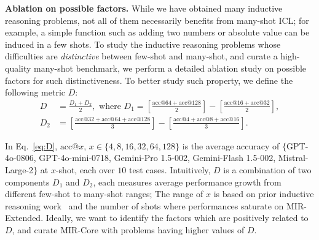 \textbf{Ablation on possible factors.} While we have obtained many inductive reasoning problems, not all of them necessarily benefits from many-shot ICL; for example, a simple function such as adding two numbers or absolute value can be induced in a few shots. To study the inductive reasoning problems whose difficulties are \textit{distinctive} between few-shot and many-shot, and curate a high-quality many-shot benchmark, we perform a detailed ablation study on possible factors for such distinctiveness. To better study such property, we define the following metric $D$:
\begin{equation}
\label{eq:D}
\begin{aligned}
D&=\frac{D_1+D_2}{2},\text{ where }
D_1=\left[\frac{\text{acc}@64+\text{acc}@128}{2}\right]-\left[\frac{\text{acc}@16+\text{acc}@32}{2}\right],\\
D_2&=\left[\frac{\text{acc}@32+\text{acc}@64+\text{acc}@128}{3}\right]-\left[\frac{\text{acc}@4+\text{acc}@8+\text{acc}@16}{3}\right].
\end{aligned}
\end{equation}
 

In Eq.~\eqref{eq:D}, $\text{acc}@x$, $x\in\{4,8,16,32,64,128\}$ is the average accuracy of $\{$GPT-4o-0806, GPT-4o-mini-0718, Gemini-Pro 1.5-002, Gemini-Flash 1.5-002, Mistral-Large-2$\}$ at $x$-shot, each over $10$ test cases. 
Intuitively, $D$ is a combination of two components $D_1$ and $D_2$, each measures average performance growth from different few-shot to many-shot ranges; The range of $x$ is based on prior inductive reasoning work~\citep{chollet2019measure} and the number of shots where performances saturate on MIR-Extended. Ideally, we want to identify the factors which are positively related to $D$, and curate MIR-Core with problems having higher values of $D$.

